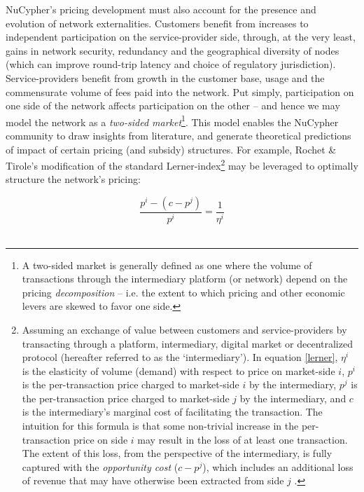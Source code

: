 \documentclass[longbibliography,nofootinbib]{revtex4-1}
\begin{document}
NuCypher’s pricing development must also account for the presence and evolution of network externalities. Customers benefit from increases to independent participation on the service-provider side, through, at the very least, gains in network security, redundancy and the geographical diversity of nodes (which can improve round-trip latency and choice of regulatory jurisdiction). Service-providers benefit from growth in the customer base, usage and the commensurate volume of fees paid into the network. Put simply, participation on one side of the network affects participation on the other – and hence we may model the network as a \textit{two-sided market}\footnote{A two-sided market is generally defined as one where the volume of transactions through the intermediary platform (or network) depend on the pricing \textit{decomposition} – i.e. the extent to which pricing and other economic levers are skewed to favor one side.}. This model enables the NuCypher community to draw insights from literature, and generate theoretical predictions of impact of certain pricing (and subsidy) structures. For example, Rochet \& Tirole's modification of the standard Lerner-index\footnote{Assuming an exchange of value between customers and service-providers by transacting through a platform, intermediary, digital market or decentralized protocol (hereafter referred to as the `intermediary'). In equation \ref{lerner}, $\eta^i$ is the elasticity of volume (demand) with respect to price on market-side $i$, $p^i$ is the per-transaction price charged to market-side $i$ by the intermediary, $p^j$ is the per-transaction price charged to market-side $j$ by the intermediary, and $c$ is the intermediary's marginal cost of facilitating the transaction. The intuition for this formula is that some non-trivial increase in the per-transaction price on side $i$ may result in the loss of at least one transaction. The extent of this loss, from the perspective of the intermediary, is fully captured with the \textit{opportunity cost} ($c - p^j$), which includes an additional loss of revenue that may have otherwise been extracted from side $j$ \cite{RTprogress}.} may be leveraged to optimally structure the network's pricing: 

\begin{equation}
\label{lerner}
    \frac{p^i - (c - p^j)}{p^i} = \frac{1}{\eta^i}   
\end{equation} \
\end{document}
